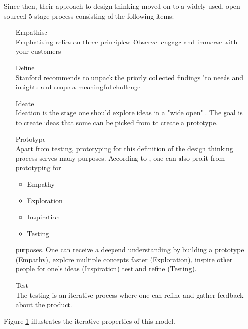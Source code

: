 Since then, their approach to design thinking moved on to a widely used, open-sourced 5 stage process \parencite{designThinkingCrashCourse}
consisting of the following items:
\begin{itemize}
    \item [Empathise] \hfill \\
    Emphatising relies on three principles: Observe, engage and immerse with your customers
    \item [Define] \hfill \\
    Stanford recommends to unpack the priorly collected findings "to needs and insights and scope a meaningful challenge \parencite{designThinkingBootleg}
    \item [Ideate] \hfill \\
    Ideation is the stage one should explore ideas in a "wide open" \parencite{designThinkingBootleg}. The goal is to create ideas that some 
    can be picked from to create a prototype.
    \item [Prototype] \hfill \\
    Apart from testing, prototyping for this definition of the design thinking process serves many purposes. 
    According to \parencite{designThinkingBootleg}, one can also profit from prototyping for
    \begin{itemize}
        \item Empathy
        \item Exploration
        \item Inspiration
        \item Testing
    \end{itemize}
    purposes. One can receive a deepend understanding by building a prototype (Empathy), explore multiple concepts faster (Exploration),
    inspire other people for one's ideas (Inspiration) test and refine (Testing). 

    \item [Test] \hfill \\
    The testing is an iterative process where one can refine and gather feedback about the product.
\end{itemize}
Figure \ref{fig:designThinking} illustrates the iterative properties of this model.

\begin{figure}[h]
	\centering
	\caption[designThinking]{}
	\label{fig:designThinking}
  \end{figure}

